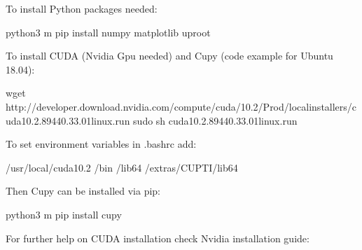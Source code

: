 \documentclass[letterpaper,10pt,english]{sphinxmanual}
\begin{document}
To install Python packages needed:

\begin{sphinxVerbatim}[commandchars=\\\{\}]
python3 \PYGZhy{}m pip install numpy matplotlib uproot
\end{sphinxVerbatim}

To install CUDA (Nvidia Gpu needed) and Cupy (code example for Ubuntu 18.04):

\begin{sphinxVerbatim}[commandchars=\\\{\}]
wget http://developer.download.nvidia.com/compute/cuda/10.2/Prod/local\PYGZus{}installers/cuda\PYGZus{}10.2.89\PYGZus{}440.33.01\PYGZus{}linux.run
sudo sh cuda\PYGZus{}10.2.89\PYGZus{}440.33.01\PYGZus{}linux.run
\end{sphinxVerbatim}

To set environment variables in .bashrc add:

\begin{sphinxVerbatim}[commandchars=\\\{\}]
 /usr/local/cuda\PYGZhy{}10.2
 /bin
/lib64
/extras/CUPTI/lib64
\end{sphinxVerbatim}

Then Cupy can be installed via pip:

\begin{sphinxVerbatim}[commandchars=\\\{\}]
python3 \PYGZhy{}m pip install cupy
\end{sphinxVerbatim}

For further help on CUDA installation check Nvidia installation guide: 
\end{document}
